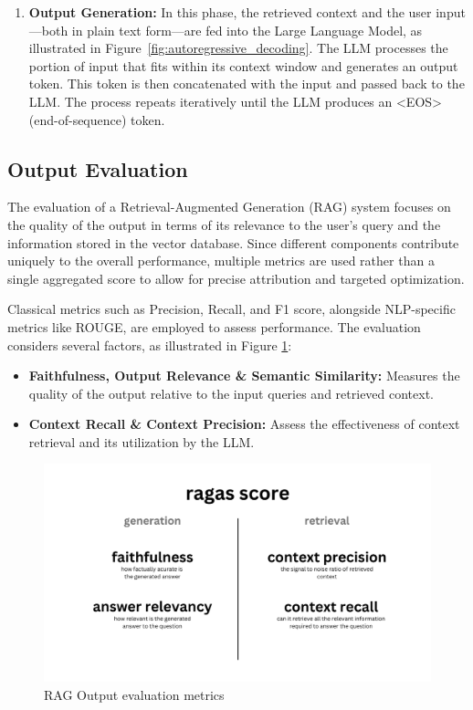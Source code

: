 \begin{enumerate}[label=\alph*.]
\item \textbf{Output Generation:}
In this phase, the retrieved context and the user input—both in plain text form—are fed into the Large Language Model, as illustrated in Figure~\ref{fig:autoregressive_decoding}. The LLM processes the portion of input that fits within its context window and generates an output token. This token is then concatenated with the input and passed back to the LLM. The process repeats iteratively until the LLM produces an \textless{}EOS\textgreater{} (end-of-sequence) token.


\end{enumerate}

\subsection{Output Evaluation}
The evaluation of a Retrieval-Augmented Generation (RAG) system focuses on the quality of the output in terms of its relevance to the user's query and the information stored in the vector database. Since different components contribute uniquely to the overall performance, multiple metrics are used rather than a single aggregated score to allow for precise attribution and targeted optimization.

Classical metrics such as Precision, Recall, and F1 score, alongside NLP-specific metrics like ROUGE, are employed to assess performance. The evaluation considers several factors, as illustrated in Figure \ref{fig:RAGOutputevaluationmetrics}:
\begin{itemize}
    \item \textbf{Faithfulness, Output Relevance \& Semantic Similarity:} Measures the quality of the output relative to the input queries and retrieved context.
    \item \textbf{Context Recall \& Context Precision:} Assess the effectiveness of context retrieval and its utilization by the LLM.
\end{itemize}
\begin{figure}[H]
    \centering
    \includegraphics[width=0.56\linewidth]{images/rag-eval.png}
    \caption{RAG Output evaluation metrics ~\cite{cardenas2023rag}}
    \label{fig:RAGOutputevaluationmetrics}
\end{figure}

